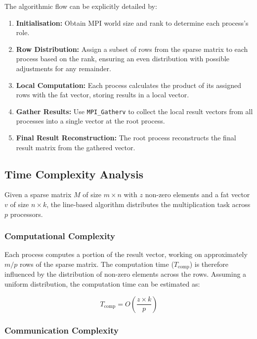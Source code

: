 \documentclass[12pt,oneside]{book} %
\begin{document}
The algorithmic flow can be explicitly detailed by:
\begin{enumerate}
    \item \textbf{Initialisation:} Obtain MPI world size and rank to determine each process's role.
    \item \textbf{Row Distribution:} Assign a subset of rows from the sparse matrix to each process based on the rank, ensuring an even distribution with possible adjustments for any remainder.
    \item \textbf{Local Computation:} Each process calculates the product of its assigned rows with the fat vector, storing results in a local vector.
    \item \textbf{Gather Results:} Use \texttt{MPI\_Gatherv} to collect the local result vectors from all processes into a single vector at the root process.
    \item \textbf{Final Result Reconstruction:} The root process reconstructs the final result matrix from the gathered vector.
\end{enumerate}

\subsection{Time Complexity Analysis}
Given a sparse matrix $M$ of size $m \times n$ with $z$ non-zero elements and a
fat vector $v$ of size $n \times k$, the line-based algorithm distributes the
multiplication task across $p$ processors.

\subsubsection{Computational Complexity}

Each process computes a portion of the result vector, working on approximately
\(m/p\) rows of the sparse matrix. The computation time (\(T_{\text{comp}}\))
is therefore influenced by the distribution of non-zero elements across the
rows. Assuming a uniform distribution, the computation time can be estimated
as:

\begin{equation}
    T_{\text{comp}} = O\left(\frac{z \times k}{p}\right)
\end{equation}

\subsubsection{Communication Complexity}
\end{document}
